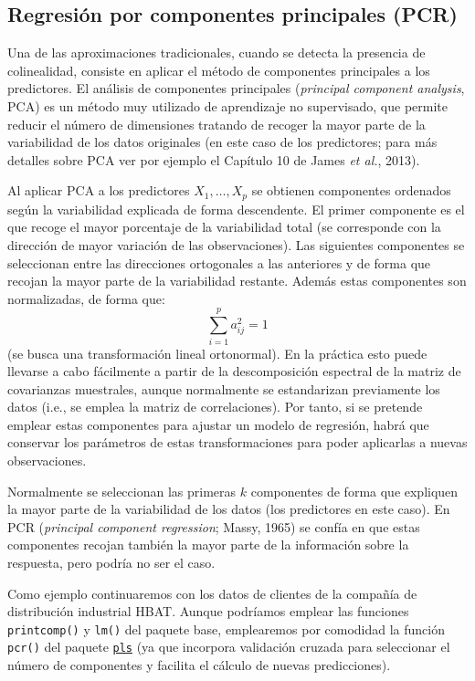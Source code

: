 \documentclass[
]{book}
\theoremstyle{break}
\theoremstyle{definition}
\theoremstyle{definition}
\theoremstyle{definition}
\theoremstyle{definition}
\theoremstyle{remark}
\begin{document}
\hypertarget{regresiuxf3n-por-componentes-principales-pcr}{%
\subsection{Regresión por componentes principales (PCR)}\label{regresiuxf3n-por-componentes-principales-pcr}}

Una de las aproximaciones tradicionales, cuando se detecta la presencia de colinealidad, consiste en aplicar el método de componentes principales a los predictores.
El análisis de componentes principales (\emph{principal component analysis}, PCA) es un método muy utilizado de aprendizaje no supervisado, que permite reducir el número de dimensiones tratando de recoger la mayor parte de la variabilidad de los datos originales (en este caso de los predictores; para más detalles sobre PCA ver por ejemplo el Capítulo 10 de James \emph{et al.}, 2013).

Al aplicar PCA a los predictores \(X_1, \ldots, X_p\) se obtienen componentes ordenados según la variabilidad explicada de forma descendente.
El primer componente es el que recoge el mayor porcentaje de la variabilidad total (se corresponde con la dirección de mayor variación de las observaciones).
Las siguientes componentes se seleccionan entre las direcciones ortogonales a las anteriores y de forma que recojan la mayor parte de la variabilidad restante.
Además estas componentes son normalizadas, de forma que:
\[\sum_{i=1}^p a_{ij}^2 = 1\]
(se busca una transformación lineal ortonormal).
En la práctica esto puede llevarse a cabo fácilmente a partir de la descomposición espectral de la matriz de covarianzas muestrales, aunque normalmente se estandarizan previamente los datos (i.e., se emplea la matriz de correlaciones).
Por tanto, si se pretende emplear estas componentes para ajustar un modelo de regresión, habrá que conservar los parámetros de estas transformaciones para poder aplicarlas a nuevas observaciones.

Normalmente se seleccionan las primeras \(k\) componentes de forma que expliquen la mayor parte de la variabilidad de los datos (los predictores en este caso).
En PCR (\emph{principal component regression}; Massy, 1965) se confía en que estas componentes recojan también la mayor parte de la información sobre la respuesta, pero podría no ser el caso.

Como ejemplo continuaremos con los datos de clientes de la compañía de distribución industrial HBAT.
Aunque podríamos emplear las funciones \texttt{printcomp()} y \texttt{lm()} del paquete base, emplearemos por comodidad la función \texttt{pcr()} del paquete \href{https://mevik.net/work/software/pls.html}{\texttt{pls}} (ya que incorpora validación cruzada para seleccionar el número de componentes y facilita el cálculo de nuevas predicciones).
\end{document}
